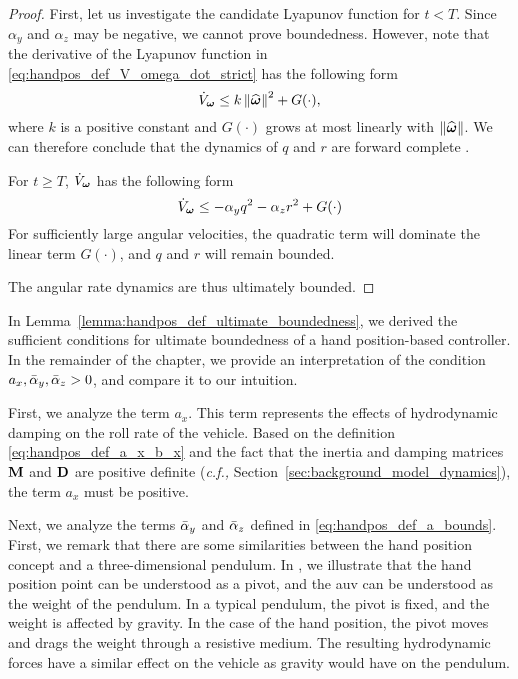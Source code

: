 \begin{proof}
    First, let us investigate the candidate Lyapunov function for $t < T$.
    Since $\alpha_y$ and $\alpha_z$ may be negative, we cannot prove boundedness.
    However, note that the derivative of the Lyapunov function in \eqref{eq:handpos_def_V_omega_dot_strict} has the following form
    \begin{equation}
        \dot{V}_{\bm{\omega}} \leq k \left\|\widehat{\bm{\omega}}\right\|^2 + G(\cdot),
    \end{equation}
    where $k$ is a positive constant and $G(\cdot)$ grows at most linearly with $\left\|\widehat{\bm{\omega}}\right\|$.
    We can therefore conclude that the dynamics of $q$ and $r$ are forward complete \cite{angeli_forward_1999}.

    For $t \geq T$, $\dot{V}_{\bm{\omega}}$ has the following form
    \begin{equation}
        \dot{V}_{\bs{\omega}} \leq -\alpha_yq^2 - \alpha_zr^2 + G(\cdot)%
    \end{equation}
    For sufficiently large angular velocities, the quadratic term will dominate the linear term $G(\cdot)$, and $q$ and $r$ will remain bounded.
    
    The angular rate dynamics are thus ultimately bounded.        
\end{proof}

In Lemma~\ref{lemma:handpos_def_ultimate_boundedness}, we derived the sufficient conditions for ultimate boundedness of a hand position-based controller.
In the remainder of the chapter, we provide an interpretation of the condition $a_x, \Bar{\alpha}_y, \Bar{\alpha}_z > 0$, and compare it to our intuition.

First, we analyze the term $a_x$.
This term represents the effects of hydrodynamic damping on the roll rate of the vehicle.
Based on the definition \eqref{eq:handpos_def_a_x_b_x} and the fact that the inertia and damping matrices $\mathbf{M}$ and $\mathbf{D}$ are positive definite (\emph{c.f.,} Section~\ref{sec:background_model_dynamics}), the term $a_x$ must be positive.

Next, we analyze the terms $\Bar{\alpha}_y$ and $\Bar{\alpha}_z$ defined in \eqref{eq:handpos_def_a_bounds}.
First, we remark that there are some similarities between the hand position concept and a three-dimensional pendulum.
In , we illustrate that the hand position point can be understood as a pivot, and the \gls{auv} can be understood as the weight of the pendulum.
In a typical pendulum, the pivot is fixed, and the weight is affected by gravity.
In the case of the hand position, the pivot moves and drags the weight through a resistive medium.
The resulting hydrodynamic forces have a similar effect on the vehicle as gravity would have on the pendulum.

